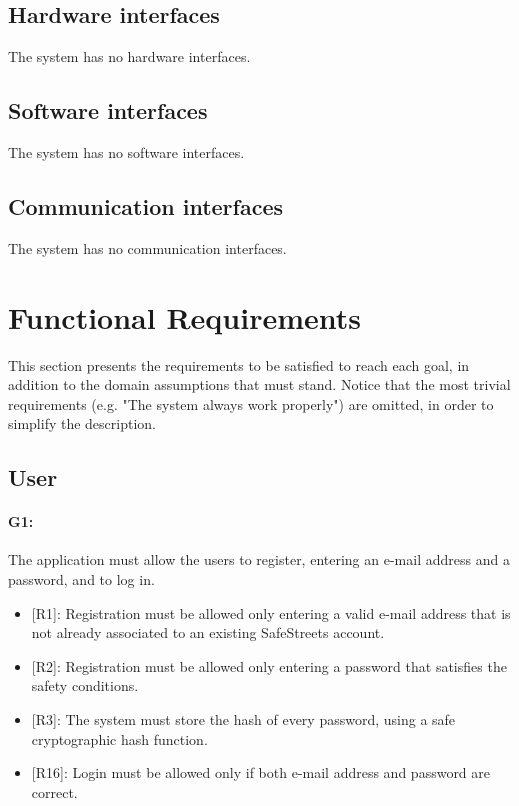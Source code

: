 \documentclass[12pt,a4paper]{report}
\begin{document}
		\subsection{Hardware interfaces}
			The system has no hardware interfaces.
		\subsection{Software interfaces}
			The system has no software interfaces.
		\subsection{Communication interfaces}
			The system has no communication interfaces.
	\section{Functional Requirements}
		This section presents the requirements to be satisfied to reach each goal, in addition to the domain assumptions that must stand. Notice that the
		most trivial requirements (e.g. "The system always work properly") are omitted, in order to simplify the description.
		\subsection{User} 

			\paragraph {G1:} The application must allow the users to register, entering an e-mail address and a password, and to log in.
			\begin{itemize}
				\item{[R1]:} Registration must be allowed only entering a valid e-mail address that is not already associated to an existing SafeStreets account.
				\item{[R2]:} Registration must be allowed only entering a password that satisfies the safety conditions.
				\item{[R3]:} The system must store the hash of every password, using a safe cryptographic hash function.
				\item{[R16]}: Login must be allowed only if both e-mail address and password are correct.
			\end{itemize}
\end{document}
